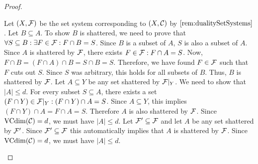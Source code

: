 \begin{proof}
\begin{outline}
\0 Let $(X,\mathcal{F})$ be the set system corresponding to $(X,\mathcal{C})$ by $\cref{rem:dualitySetSystems}$.
    \1[(1)] Let $B\subseteq A$. To show $B$ is shattered, we need to prove that $\forall S \subseteq B : \exists F \in \mathcal{F} : F\cap B = S$. Since $B$ is a subset of $A$, $S$ is also a subset of $A$. Since $A$ is shattered by $\mathcal{F}$, there exists $F\in\mathcal{F} : F\cap A = S$. Now, $F\cap B = (F\cap A) \cap B = S\cap B = S$. Therefore, we have found $F\in\mathcal{F}$ such that $F$ cuts out $S$. Since $S$ was arbitrary, this holds for all subsets of $B$. Thus, $B$ is shattered by $\mathcal{F}$.
    \1[(2)] Let $A\subseteq Y$ be any set shattered by $\mathcal{F}|_Y$. We need to show that $|A| \leq d$.
    For every subset $S\subseteq A$, there exists a set $(F\cap Y)\in\mathcal{F}|_Y : (F\cap Y)\cap A = S$. Since $A\subseteq Y$, this implies $(F\cap Y)\cap A = F\cap A = S$. Therefore $A$ is also shattered by $\mathcal{F}$. Since $\operatorname{VCdim}(\mathcal{C}) = d$, we must have $|A|\leq d$.
    \1[(3)] Let $\mathcal{F}' \subseteq \mathcal{F}$ and let $A$ be any set shattered by $\mathcal{F}'$. Since $\mathcal{F}'\subseteq \mathcal{F}$ this automatically implies that $A$ is shattered by $\mathcal{F}$. Since $\operatorname{VCdim}(\mathcal{C}) = d$, we must have $|A|\leq d$.
\end{outline}
\end{proof}

